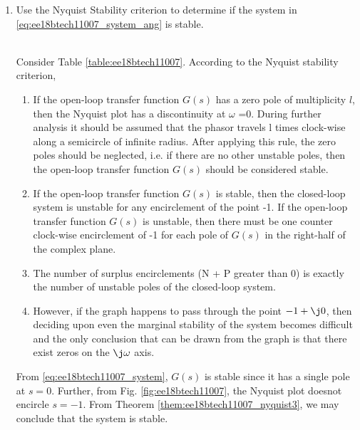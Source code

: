 \begin{enumerate}[label=\thesubsection.\arabic*.,ref=\thesubsection.\theenumi]
%
\item Use the Nyquist Stability criterion to determine if the system in \eqref{eq:ee18btech11007_system_ang} is stable.
\begin{table}[!ht]
\centering

\caption{}
\label{table:ee18btech11007}
\end{table}
\\
\solution Consider Table \ref{table:ee18btech11007}.  According to the Nyquist stability criterion, 
\begin{enumerate}
\item If the open-loop transfer function $G(s)$ has a zero pole of multiplicity $l$, then the Nyquist plot has a discontinuity at $\omega$ =0. During further analysis it should be assumed that the phasor travels l times clock-wise along a semicircle of infinite radius. After applying this rule, the zero poles should be neglected, i.e. if there are no other unstable poles, then the open-loop transfer function $G(s)$ should be considered stable.
\item If the open-loop transfer function $G(s)$ is stable, then the closed-loop system is unstable for any encirclement of the point -1.
If the open-loop transfer function $G(s)$ is unstable, then there must be one counter clock-wise encirclement of -1 for each pole of $G(s)$ in the right-half of the complex plane.
\label{them:ee18btech11007_nyquist3}
\item The number of surplus encirclements (N + P greater than 0) is exactly the number of unstable poles of the closed-loop system.
\item However, if the graph happens to pass through the point $-1+\j0$, then deciding upon even the marginal stability of the system becomes difficult and the only conclusion that can be drawn from the graph is that there exist zeros on the $\j \omega$  axis.
\end{enumerate}
From \eqref{eq:ee18btech11007_system}, $G(s)$ is stable since it has a single pole at $s = 0$.  Further,  from Fig.  \ref{fig:ee18btech11007}, the Nyquist plot doesnot encircle $s =  -1$.  From  Theorem \ref{them:ee18btech11007_nyquist3}, we may conclude that the system is stable.


\end{enumerate}
